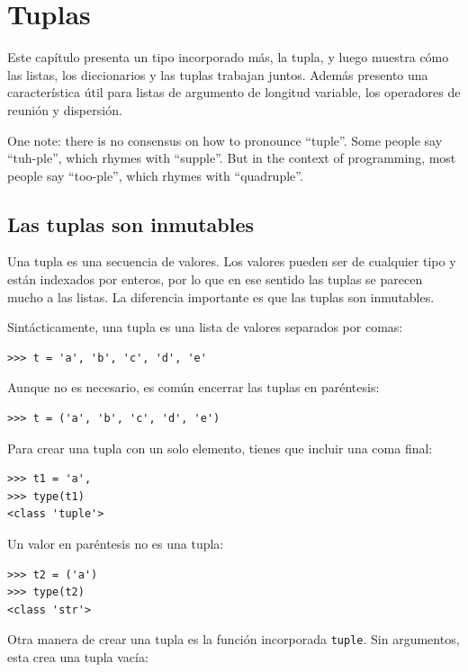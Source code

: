 \documentclass[10pt]{book}
\begin{document}
\chapter{Tuplas}
\label{tuplechap}

Este capítulo presenta un tipo incorporado más, la tupla, y luego
muestra cómo las listas, los diccionarios y las tuplas trabajan juntos.
Además presento una característica útil para listas de argumento de longitud variable,
los operadores de reunión y dispersión.

One note: there is no consensus on how to pronounce ``tuple''.
Some people say ``tuh-ple'', which rhymes with ``supple''.  But
in the context of programming, most people say ``too-ple'', which
rhymes with ``quadruple''.


\section{Las tuplas son inmutables}

Una tupla es una secuencia de valores.  Los valores pueden ser de cualquier tipo y 
están indexados por enteros, por lo que en ese sentido las tuplas se parecen mucho
a las listas.  La diferencia importante es que las tuplas son inmutables.

Sintácticamente, una tupla es una lista de valores separados por comas:

\begin{verbatim}
>>> t = 'a', 'b', 'c', 'd', 'e'
\end{verbatim}
%
Aunque no es necesario, es común encerrar las tuplas en
paréntesis:

\begin{verbatim}
>>> t = ('a', 'b', 'c', 'd', 'e')
\end{verbatim}
%
Para crear una tupla con un solo elemento, tienes que incluir una coma
final:

\begin{verbatim}
>>> t1 = 'a',
>>> type(t1)
<class 'tuple'>
\end{verbatim}
%
Un valor en paréntesis no es una tupla:

\begin{verbatim}
>>> t2 = ('a')
>>> type(t2)
<class 'str'>
\end{verbatim}
%
Otra manera de crear una tupla es la función incorporada {\tt tuple}.
Sin argumentos, esta crea una tupla vacía:
\end{document}
